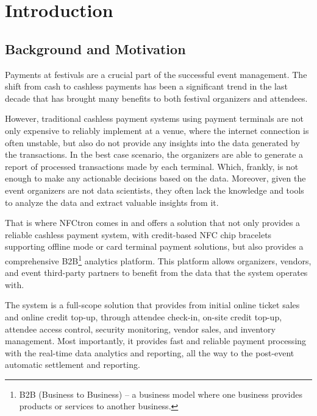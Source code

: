 \chapter*{Introduction}
\label{ch:introduction}


\section*{Background and Motivation}
\label{sec:introduction-background-motivation}
Payments at festivals are a crucial part of the successful event management.
The shift from cash to cashless payments has been a significant trend in the last decade that has brought many benefits to both festival organizers and attendees\cite{bl_en_waarom_festivals_overstappen_op_cashless_betalen}.

However, traditional cashless payment systems using payment terminals are not only expensive to reliably implement at a venue, where the internet connection is often unstable, but also do not provide any insights into the data generated by the transactions.
In the best case scenario, the organizers are able to generate a report of processed transactions made by each terminal.
Which, frankly, is not enough to make any actionable decisions based on the data.
Moreover, given the event organizers are not data scientists, they often lack the knowledge and tools to analyze the data and extract valuable insights from it.

That is where NFCtron comes in and offers a solution that not only provides a reliable cashless payment system, with credit-based NFC chip bracelets supporting offline mode or card terminal payment solutions,
but also provides a comprehensive B2B\footnote{B2B (Business to Business) – a business model where one business provides products or services to another business.} analytics platform.
This platform allows organizers, vendors, and event third-party partners to benefit from the data that the system operates with\cite{nfctron_en_company}.

The system is a full-scope solution that provides from initial online ticket sales and online credit top-up, through attendee check-in, on-site credit top-up, attendee access control, security monitoring, vendor sales, and inventory management.
Most importantly, it provides fast and reliable payment processing with the real-time data analytics and reporting, all the way to the post-event automatic settlement and reporting.

